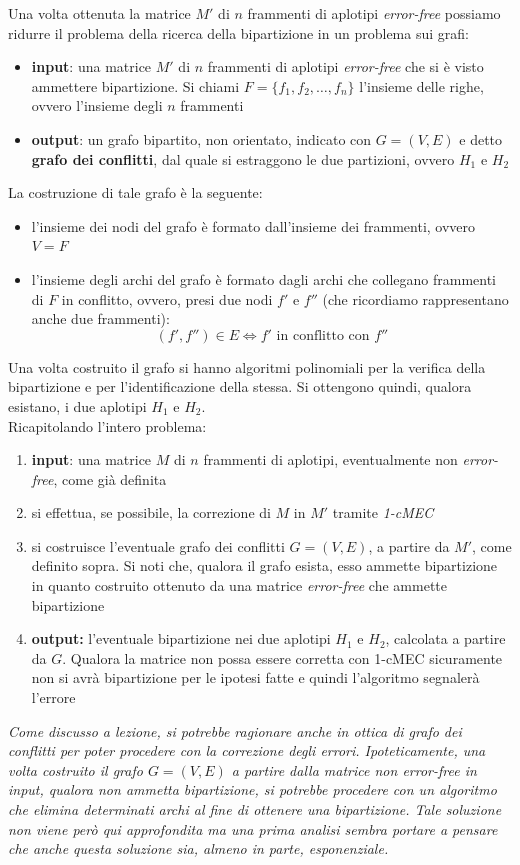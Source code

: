 \documentclass[a4paper,12pt, oneside]{book}
\begin{document}
\noindent
Una volta ottenuta la matrice $M'$ di $n$ frammenti di aplotipi
\textit{error-free} possiamo ridurre il problema della ricerca della
bipartizione in un problema sui grafi:
\begin{itemize}
  \item \textbf{input}: una matrice $M'$ di $n$ frammenti di aplotipi
  \textit{error-free} che si è visto ammettere bipartizione. Si chiami
  $F=\{f_1,f_2,\ldots, f_n\}$ l'insieme delle righe, ovvero l'insieme degli $n$
  frammenti 
  \item \textbf{output}: un grafo bipartito, non orientato, indicato con $G
  =(V,E)$ e detto \textbf{grafo dei conflitti}, dal quale si estraggono le due
  partizioni, ovvero $H_1$ e $H_2$
\end{itemize}
\newpage
La costruzione di tale grafo è la seguente:
\begin{itemize}
  \item l'insieme dei nodi del grafo è formato dall'insieme dei frammenti,
  ovvero $V=F$
  \item l'insieme degli archi del grafo è formato dagli archi che collegano
  frammenti di $F$ in conflitto, ovvero, presi due nodi $f'$ e $f''$ (che
  ricordiamo rappresentano anche due frammenti):
  \[(f',f'')\in E \iff \mbox{$f'$ in conflitto con $f''$}\]
\end{itemize}
Una volta costruito il grafo si hanno algoritmi polinomiali per la verifica
della bipartizione e per l'identificazione della stessa. Si ottengono quindi,
qualora esistano, i due aplotipi $H_1$ e $H_2$.\\

\noindent
Ricapitolando l'intero problema:
\begin{enumerate}
  \item \textbf{input}: una matrice $M$ di $n$ frammenti di aplotipi,
  eventualmente non \textit{error-free}, come già definita
  \item si effettua, se possibile, la correzione di $M$ in $M'$ tramite
  \textit{1-cMEC} 
  \item si costruisce l'eventuale grafo dei conflitti $G=(V,E)$, a partire da
  $M'$, come definito sopra. Si noti che, qualora il grafo esista, esso ammette
  bipartizione in quanto costruito ottenuto da una matrice \textit{error-free}
  che ammette bipartizione
  \item \textbf{output:} l'eventuale bipartizione nei due aplotipi $H_1$ e
  $H_2$, calcolata a partire da $G$. Qualora la matrice non possa essere
  corretta con 1-cMEC sicuramente non si avrà bipartizione per le ipotesi fatte
  e quindi l'algoritmo segnalerà l'errore
\end{enumerate}
\textit{Come discusso a lezione, si potrebbe ragionare anche in ottica di grafo
  dei conflitti per poter procedere con la correzione degli
  errori. Ipoteticamente, una volta costruito il grafo $G=(V,E)$ a partire dalla
  matrice non \textnormal{error-free} in input, qualora non
  ammetta bipartizione, si potrebbe procedere con un algoritmo che elimina
  determinati archi al fine di ottenere una bipartizione. Tale soluzione non
  viene però qui approfondita ma una prima analisi sembra portare a pensare che
  anche questa soluzione sia, almeno in parte, esponenziale.} 
\end{document}
